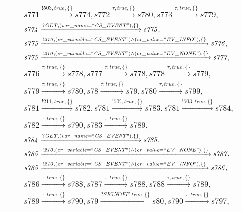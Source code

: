 \begin{tabular}{lcl}
& & $\mathit{s771}\xrightarrow{\mathit{!503}, \mathit{true}, \{\}}\mathit{s774},\mathit{s772}\xrightarrow{\mathit{\tau}, \mathit{true}, \{\}}\mathit{s780},\mathit{s773}\xrightarrow{\mathit{\tau}, \mathit{true}, \{\}}\mathit{s779},$ \\
& & $\mathit{s774}\xrightarrow{\mathit{?GET}, \mathit{(var\_name = ``CS\_EVENT")}, \{\}}\mathit{s775},$ \\
& & $\mathit{s775}\xrightarrow{\mathit{!210}, \mathit{(cr\_variable = ``CS\_EVENT") \land (cr\_value = ``EV\_INFO")}, \{\}}\mathit{s776},$ \\
& & $\mathit{s775}\xrightarrow{\mathit{!210}, \mathit{(cr\_variable = ``CS\_EVENT") \land (cr\_value = ``EV\_NONE")}, \{\}}\mathit{s777},$ \\
& & $\mathit{s776}\xrightarrow{\mathit{\tau}, \mathit{true}, \{\}}\mathit{s778},\mathit{s777}\xrightarrow{\mathit{\tau}, \mathit{true}, \{\}}\mathit{s778},\mathit{s778}\xrightarrow{\mathit{\tau}, \mathit{true}, \{\}}\mathit{s779},$ \\
& & $\mathit{s779}\xrightarrow{\mathit{\tau}, \mathit{true}, \{\}}\mathit{s780},\mathit{s78}\xrightarrow{\mathit{\tau}, \mathit{true}, \{\}}\mathit{s79},\mathit{s780}\xrightarrow{\mathit{\tau}, \mathit{true}, \{\}}\mathit{s799},$ \\
& & $\mathit{s781}\xrightarrow{\mathit{!211}, \mathit{true}, \{\}}\mathit{s782},\mathit{s781}\xrightarrow{\mathit{!502}, \mathit{true}, \{\}}\mathit{s783},\mathit{s781}\xrightarrow{\mathit{!503}, \mathit{true}, \{\}}\mathit{s784},$ \\
& & $\mathit{s782}\xrightarrow{\mathit{\tau}, \mathit{true}, \{\}}\mathit{s790},\mathit{s783}\xrightarrow{\mathit{\tau}, \mathit{true}, \{\}}\mathit{s789},$ \\
& & $\mathit{s784}\xrightarrow{\mathit{?GET}, \mathit{(var\_name = ``CS\_EVENT")}, \{\}}\mathit{s785},$ \\
& & $\mathit{s785}\xrightarrow{\mathit{!210}, \mathit{(cr\_variable = ``CS\_EVENT") \land (cr\_value = ``EV\_NONE")}, \{\}}\mathit{s787},$ \\
& & $\mathit{s785}\xrightarrow{\mathit{!210}, \mathit{(cr\_variable = ``CS\_EVENT") \land (cr\_value = ``EV\_INFO")}, \{\}}\mathit{s786},$ \\
& & $\mathit{s786}\xrightarrow{\mathit{\tau}, \mathit{true}, \{\}}\mathit{s788},\mathit{s787}\xrightarrow{\mathit{\tau}, \mathit{true}, \{\}}\mathit{s788},\mathit{s788}\xrightarrow{\mathit{\tau}, \mathit{true}, \{\}}\mathit{s789},$ \\
& & $\mathit{s789}\xrightarrow{\mathit{\tau}, \mathit{true}, \{\}}\mathit{s790},\mathit{s79}\xrightarrow{\mathit{?SIGNOFF}, \mathit{true}, \{\}}\mathit{s80},\mathit{s790}\xrightarrow{\mathit{\tau}, \mathit{true}, \{\}}\mathit{s797},$ \\
\end{tabular}

